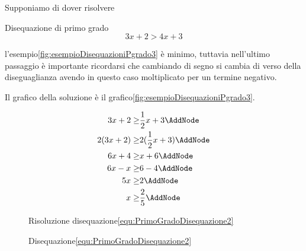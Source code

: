 Supponiamo di dover risolvere 
\begin{esempiot}{Disequazione di primo grado}{}
\begin{equation}
3x+2>4x+3\label{equ:PrimoGradoDisequazione3}
\end{equation}
\end{esempiot}
 l'esempio\nobs\vref{fig:esempioDisequazioniPgrado3} è minimo, tuttavia nell'ultimo passaggio è importante ricordarsi che cambiando di segno si cambia di verso della diseguaglianza  avendo in questo caso moltiplicato per un termine negativo.\par
Il grafico della soluzione è il grafico\nobs\vref{fig:esempioDisequazioniPgrado3}.  
\begin{figure}
\begin{NodesList}
\centering
\begin{align*}
	3x+2\geq&\dfrac{1}{2}x+3\AddNode\\
	2(3x+2)\geq&2(\dfrac{1}{2}x+3)\AddNode\\ %
	6x+4\geq&x+6\AddNode\\
	6x-x\geq&6-4\AddNode\\
	5x\geq&2\AddNode\\
	x\geq&\dfrac{2}{5}\AddNode
\end{align*}
%
%
%
%
\end{NodesList}
\captionsetup{format=esempio,list=no}\caption{Risoluzione disequazione\nobs\vref{equ:PrimoGradoDisequazione2}}
\label{fig:esempioDisequazioniPgrado2}
\end{figure}
\begin{figure}
	\centering
	\captionsetup{format=grafico,list=no}
	\caption{Disequazione\nobs\vref{equ:PrimoGradoDisequazione2}}
	\label{fig:esempioDisequazioniPgradografico2}
\end{figure}

